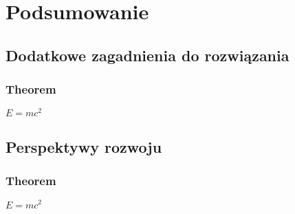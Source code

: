 \section{Podsumowanie}

\subsection{Dodatkowe zagadnienia do rozwiązania}

\begin{frame}
    \frametitle{Theorem}
    \begin{theorem}
    $E = mc^2$
    \end{theorem}
\end{frame}

\subsection{Perspektywy rozwoju}

\begin{frame}
    \frametitle{Theorem}
    \begin{theorem}
    $E = mc^2$
    \end{theorem}
\end{frame}